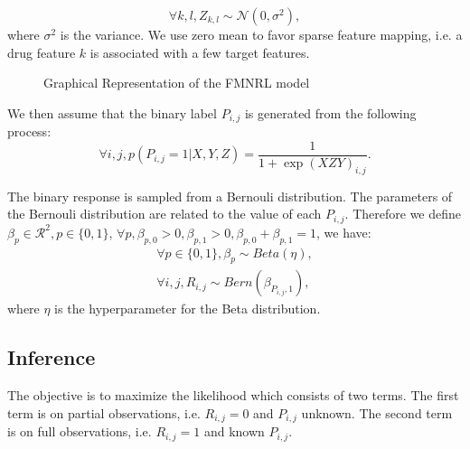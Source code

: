 \documentclass[sigconf,anonymous]{acmart}
\begin{document}
\begin{equation}\label{equ:z}
\forall k,l, Z_{k,l}\sim \mathcal{N}(0,\sigma^2),
\end{equation}
where $\sigma^2$ is the variance. We use zero mean to favor sparse feature mapping, i.e. a drug feature $k$ is associated with a few target features.

\begin{figure}
  \centering
{}
\vspace*{-5pt}
\caption{Graphical Representation of the FMNRL model}\label{fig:model}
\end{figure}

We then assume that the binary label $P_{i,j}$ is generated from the following process:
\begin{equation}\label{equ:p}
\forall i,j, p(P_{i,j}=1|X,Y,Z)=\frac{1}{1+\exp{(XZY)}_{i,j}}.
\end{equation}

The binary response is sampled from a Bernouli distribution. The parameters of the Bernouli distribution are related to the value of each $P_{i,j}$. Therefore we define $\beta_p\in\mathcal{R}^{2},p\in \{0,1\}$, $\forall p, \beta_{p,0}>0,\beta_{p,1}>0,\beta_{p,0}+\beta_{p,1}=1$, we have:
\begin{eqnarray}
\forall p\in \{0,1\}, \beta_p \sim Beta(\eta),\\
\forall i,j, R_{i,j} \sim Bern (\beta_{P_{i,j},1}),
\end{eqnarray}
where $\eta$ is the hyperparameter for the Beta distribution.

\subsection{Inference}\label{sec:inference}
The objective is to maximize the likelihood which consists of two terms. The first term is on partial observations, i.e. $R_{i,j}=0$ and $P_{i,j}$ unknown. The second term is on full observations, i.e. $R_{i,j}=1$ and known $P_{i,j}$.
\end{document}
